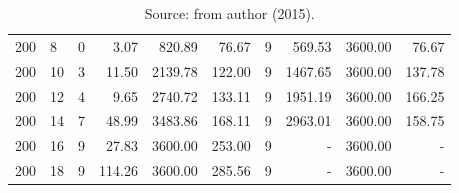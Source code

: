 \begin{appendices}
\begin{table*}[h]
\begin{center}
\begin{tabular} {l l | r r r r | r r r r}
 200 & 8                                 &  0           &  3.07         &  820.89    &  76.67           &  9            &   569.53     & 3600.00     &  76.67       \\ 
 200 & 10                                &  3           &  11.50        &  2139.78   &  122.00          &  9            &   1467.65    & 3600.00     &  137.78      \\ 
 200 & 12                                &  4           &  9.65         &  2740.72   &  133.11          &  9            &   1951.19    & 3600.00     &  166.25      \\ 
 200 & 14                                &  7           &  48.99        &  3483.86   &  168.11          &  9            &   2963.01    & 3600.00     &  158.75      \\ 
 200 & 16                                &  9           &  27.83        &  3600.00   &  253.00          &  9            &   -          & 3600.00     &  -           \\ 
 200 & 18                                &  9           &  114.26       &  3600.00   &  285.56          &  9            &   -          & 3600.00     &  -           \\
\hline
\end{tabular}\caption*{Source: from author (2015).}
\end{center}
\end{table*}


\end{appendices}
